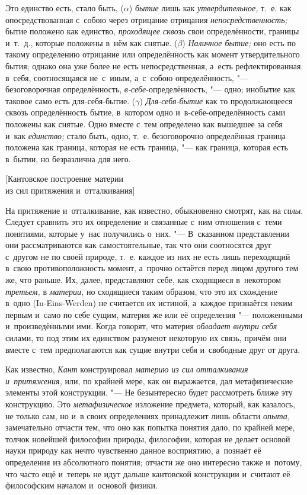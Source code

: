 Это единство есть, стало быть, ($\alpha$) {\em бытие} лишь как
{\em утвердительное,} т.~е. как опосредствованная с~собою через отрицание
отрицания {\em непосредственность;} бытие положено как единство,
{\em проходящее сквозь} свои определённости, границы и~т.~д., которые положены
в~нём как снятые. ($\beta$) {\em Наличное бытие;} оно есть по такому
определению отрицание или определённость как момент утвердительного бытия;
однако она уже более не есть непосредственная, а~есть рефлектированная в~себя,
соотносящаяся не~с~иным, а~с~собою определённость, "--- безоговорочная
определённость, {\em в-себе}-определённость, "--- одно; инобытие как таковое
само есть для-себя-бытие. ($\gamma$) {\em Для-себя-бытие} как то продолжающееся
сквозь определённость бытие, в~котором одно и~в-себе-определённость сами
положены как снятые. Одно вместе с~тем определено как вышедшее за себя и~как
{\em единство;} стало быть, одно, т.~е. безоговорочно определённая граница
положена как граница, которая не есть граница, "--- как граница, которая есть
в~бытии, но безразлична для него.

%
{[Кантовское построение материи\\из сил притяжения и~отталкивания]}

На притяжение и~отталкивание, как известно, обыкновенно смотрят, как на
{\em силы}. Следует сравнить это их определение и
связанные с~ним отношения с~теми понятиями, которые у~нас получились о~них.
"--- В~сказанном представлении они рассматриваются как самостоятельные, так
что они соотносятся друг с~другом не по своей природе, т.~е. каждое из них
не есть лишь переходящий в~свою противоположность момент, а~прочно остаётся
перед лицом другого тем же, что раньше. Их, далее, представляют себе, как
сходящиеся в~некотором {\em третьем,} в
{\em материи,} но сходящиеся таким образом, что это их
схождение в~одно (In-Eins-Werden) не считается их истиной, а~каждое
признаётся неким первым и~само по себе сущим, материя же или её
определения "--- положенными и~произведёнными ими. Когда говорят, что материя
{\em обладает внутри себя} силами, то под этим их
единством разумеют некоторую их связь, причём они вместе с~тем
предполагаются как сущие внутри себя и~свободные друг от друга.

Как известно, {\em Кант} конструировал
{\em материю из сил отталкивания и~притяжения,} или, по
крайней мере, как он выражается, дал метафизические элементы этой
конструкции. "--- Не безынтересно будет рассмотреть ближе эту конструкцию. Это
{\em метафизическое} изложение предмета, который, как
казалось, не только сам, но и~в своих определениях принадлежит лишь области
{\em опыта,} замечательно отчасти тем, что оно как
попытка понятия дало, по крайней мере, толчок новейшей философии природы,
философии, которая не делает основой науки природу как нечто чувственно
данное восприятию, а~познаёт её определения из абсолютного понятия; отчасти
же оно интересно также и~потому, что часто ещё и~теперь не идут дальше
кантовской конструкции и~считают её философским началом и~основой физики.

